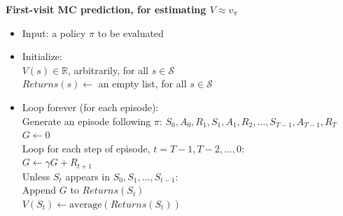 \textbf{First-visit MC prediction, for estimating $V \approx v_\pi$}
\begin{itemize}[leftmargin=*]
	\item[] Input: a policy $\pi$ to be evaluated
	\item[] Initialize:\\
	      $V(s) \in \mathbb{R}$, arbitrarily, for all $s \in \mathcal{S}$\\
	      $Returns(s) \leftarrow$ an empty list, for all $s \in \mathcal{S}$

	\item[] Loop forever (for each episode):\\
	      Generate an episode following $\pi$: $S_0, A_0, R_1, S_1, A_1, R_2, \ldots, S_{T-1}, A_{T-1}, R_T$\\
	      $G \leftarrow 0$\\
	      Loop for each step of episode, $t = T-1, T-2, \ldots, 0$:\\
	      \hspace*{1em} $G \leftarrow \gamma G + R_{t+1}$\\
	      \hspace*{1em} Unless $S_t$ appears in $S_0, S_1, \ldots, S_{t-1}$:\\
	      \hspace*{2em} Append $G$ to $Returns(S_t)$\\
	      \hspace*{2em} $V(S_t) \leftarrow \text{average}(Returns(S_t))$
\end{itemize}
